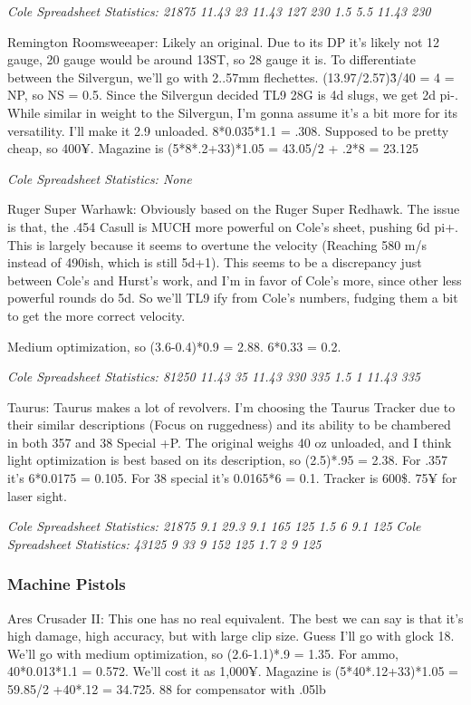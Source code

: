 \begin{multicols*}{2}
	\textit{\textcolor{OliveGreen}{Cole Spreadsheet Statistics: 21875 11.43 23 11.43 127 230 1.5 5.5 11.43 230}}
	
	Remington Roomsweeaper: Likely an original. Due to its DP it's likely not 12 gauge, 20 gauge would be around 13ST, so 28 gauge it is. To differentiate between the Silvergun, we'll go with 2..57mm flechettes. (13.97/2.57)\^3/40 = 4 = NP, so NS = 0.5. Since the Silvergun decided TL9 28G is 4d slugs, we get 2d pi-. While similar in weight to the Silvergun, I'm gonna assume it's a bit more for its versatility. I'll make it 2.9 unloaded. 8*0.035*1.1 = .308. Supposed to be pretty cheap, so 400¥. Magazine is (5*8*.2+33)*1.05 = 43.05/2 + .2*8 = 23.125
	
	\textit{\textcolor{OliveGreen}{Cole Spreadsheet Statistics: None}}
	
	Ruger Super Warhawk: Obviously based on the Ruger Super Redhawk. The issue is that, the .454 Casull is MUCH more powerful on Cole's sheet, pushing 6d pi+. This is largely because it seems to overtune the velocity (Reaching 580 m/s instead of 490ish, which is still 5d+1). This seems to be a discrepancy just between Cole's and Hurst's work, and I'm in favor of Cole's more, since other less powerful rounds do 5d. So we'll TL9 ify from Cole's numbers, fudging them a bit to get the more correct velocity.
	
	Medium optimization, so (3.6-0.4)*0.9 = 2.88. 6*0.33 = 0.2. 
	
	\textit{\textcolor{OliveGreen}{Cole Spreadsheet Statistics: 81250 11.43 35 11.43 330 335 1.5 1 11.43 335}}
	
	Taurus: Taurus makes a lot of revolvers. I'm choosing the Taurus Tracker due to their similar descriptions (Focus on ruggedness) and its ability to be chambered in both 357 and 38 Special +P. The original weighs 40 oz unloaded, and I think light optimization is best based on its description, so (2.5)*.95 = 2.38. For .357 it's 6*0.0175 = 0.105. For 38 special it's 0.0165*6 = 0.1. Tracker is 600\$. 75¥ for laser sight.
	
	\textit{\textcolor{OliveGreen}{Cole Spreadsheet Statistics: 21875 9.1 29.3 9.1 165 125 1.5 6 9.1 125}}
	\textit{\textcolor{OliveGreen}{Cole Spreadsheet Statistics: 43125 9 33 9 152 125 1.7 2 9 125}}
	
	\subsubsection{Machine Pistols}
	
	Ares Crusader II: This one has no real equivalent. The best we can say is that it's high damage, high accuracy, but with large clip size. Guess I'll go with glock 18. We'll go with medium optimization, so (2.6-1.1)*.9 = 1.35. For ammo, 40*0.013*1.1 = 0.572. We'll cost it as 1,000¥. Magazine is (5*40*.12+33)*1.05 = 59.85/2 +40*.12 = 34.725. 88 for compensator with .05lb
	

\end{multicols*}
